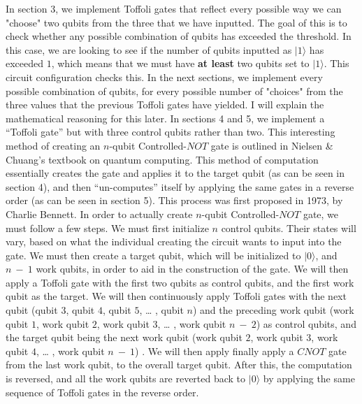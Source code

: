 \documentclass{article}
\begin{document}
\newline\newline
In section 3, we implement Toffoli gates that reflect every possible way we can "choose" two qubits from the three that we have inputted. The goal of this is to check whether any possible combination of qubits has exceeded the threshold. In this case, we are looking to see if the number of qubits inputted as $|1\rangle$ has exceeded $1$, which means that we must have \textbf{at least} two qubits set to $|1\rangle$. This circuit configuration checks this. 
\newline\newline
In the next sections, we implement every possible combination of qubits, for every possible number of "choices" from the three values that the previous Toffoli gates have yielded. I will explain the mathematical reasoning for this later.
\newline\newline
In sections 4 and 5, we implement a “Toffoli gate” but with three control qubits rather than two. This interesting method of creating an $n$-qubit Controlled-$NOT$ gate is outlined in Nielsen & Chuang’s textbook on quantum computing. This method of computation essentially creates the gate and applies it to the target qubit (as can be seen in section 4), and then “un-computes” itself by applying the same gates in a reverse order (as can be seen in section 5). This process was first proposed in 1973, by Charlie Bennett.
\newline\newline
In order to actually create $n$-qubit Controlled-$NOT$ gate, we must follow a few steps. We must first initialize $n$ control qubits. Their states will vary, based on what the individual creating the circuit wants to input into the gate. We must then create a target qubit, which will be initialized to $|0\rangle$, and $n \ - \ 1$ work qubits, in order to aid in the construction of the gate. We will then apply a Toffoli gate with the first two qubits as control qubits, and the first work qubit as the target. We will then continuously apply Toffoli gates with the next qubit (qubit $3$, qubit $4$, qubit $5$, … , qubit $n$) and the preceding work qubit (work qubit $1$, work qubit $2$, work qubit $3$, … , work qubit $n \ - \ 2$) as control qubits, and the target qubit being the next work qubit (work qubit $2$, work qubit $3$, work qubit $4$, … , work qubit $n \ - \ 1$) . We will then apply finally apply a $CNOT$ gate from the last work qubit, to the overall target qubit. After this, the computation is reversed, and all the work qubits are reverted back to $|0\rangle$ by applying the same sequence of Toffoli gates in the reverse order.
\end{document}
